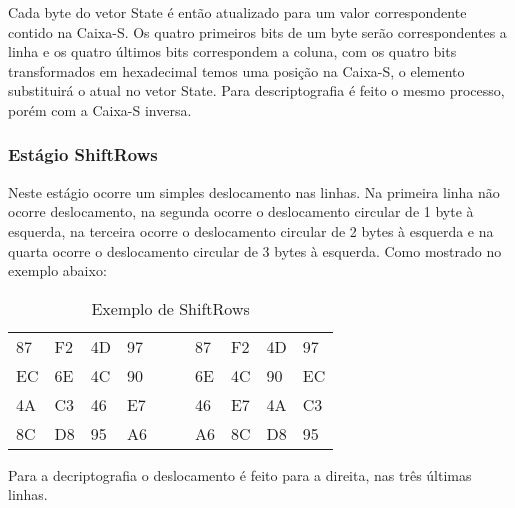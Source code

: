 Cada byte do vetor State é então atualizado para um valor correspondente contido na Caixa-S. Os quatro primeiros bits de um byte serão correspondentes a linha e os quatro últimos bits correspondem a coluna, com os quatro bits transformados em hexadecimal temos uma posição na Caixa-S, o elemento substituirá o atual no vetor State.
Para descriptografia é feito o mesmo processo, porém com a Caixa-S inversa.


\subsubsection{Estágio ShiftRows}
Neste estágio ocorre um simples deslocamento nas linhas. Na primeira linha não ocorre deslocamento, na segunda ocorre o deslocamento circular de 1 byte à esquerda, na terceira ocorre o deslocamento circular de 2 bytes à esquerda e na quarta ocorre o deslocamento circular de 3 bytes à esquerda. Como mostrado no exemplo abaixo:\par
\begin{table}[tbh]
	\centering
	\caption{Exemplo de ShiftRows}
	\label{tab3}
	\begin{tabular}{|l|l|l|l|ll|l|l|l|l|}
		\cline{1-4} \cline{7-10}
		87 & F2 & 4D & 97 & \textrightarrow &  & 87 & F2 & 4D & 97 \\ \cline{1-4} \cline{7-10} 
		EC & 6E & 4C & 90 & \textrightarrow &  & 6E & 4C & 90 & EC \\ \cline{1-4} \cline{7-10} 
		4A & C3 & 46 & E7 & \textrightarrow &  & 46 & E7 & 4A & C3 \\ \cline{1-4} \cline{7-10} 
		8C & D8 & 95 & A6 & \textrightarrow &  & A6 & 8C & D8 & 95 \\ \cline{1-4} \cline{7-10} 
	\end{tabular}
\end{table}
Para a decriptografia o deslocamento é feito para a direita, nas três últimas linhas.

